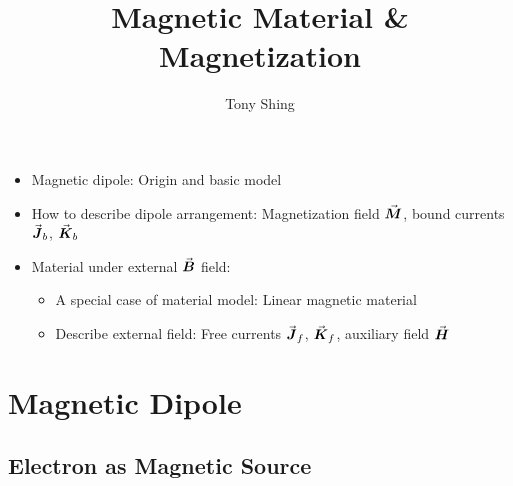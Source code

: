 \documentclass[class=article, crop=false, 12pt]{standalone}
\author{Tony Shing}
\title{Magnetic Material \& Magnetization}
\begin{document}
\maketitle


\begin{overview}
    \begin{itemize}
        \item Magnetic dipole: Origin and basic model
        \item How to describe dipole arrangement: Magnetization field $\va*{M}$, bound currents $\va*{J}_b$, $\va*{K}_b$
        \item Material under external $\va*{B}$ field: 
        \begin{itemize}
            \item A special case of material model: {Linear magnetic material} 
            \item Describe external field: Free currents $\va*{J}_f$, $\va*{K}_f$, auxiliary field $\va*{H}$
        \end{itemize}
    \end{itemize}
\end{overview}



\section{Magnetic Dipole}

\subsection{Electron as Magnetic Source}
\end{document}
